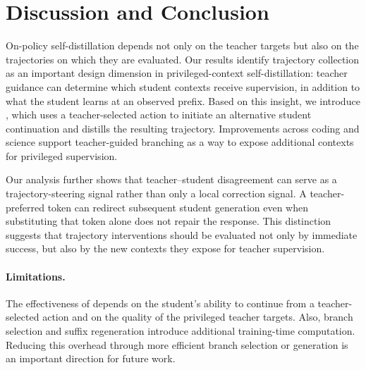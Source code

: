 \section{Discussion and Conclusion}
\label{sec:discussion}









On-policy self-distillation depends not only on the teacher targets but also on the trajectories on which they are evaluated. Our results identify trajectory collection as an important design dimension in privileged-context self-distillation: teacher guidance can determine which student contexts receive supervision, in addition to what the student learns at an observed prefix. Based on this insight, we introduce \method{}, which uses a teacher-selected action to initiate an alternative student continuation and distills the resulting trajectory. Improvements across coding and science support teacher-guided branching as a way to expose additional contexts for privileged supervision.

Our analysis further shows that teacher--student disagreement can serve as a trajectory-steering signal rather than only a local correction signal. A teacher-preferred token can redirect subsequent student generation even when substituting that token alone does not repair the response. This distinction suggests that trajectory interventions should be evaluated not only by immediate success, but also by the new contexts they expose for teacher supervision.

\vspace{-0.1cm}\paragraph{Limitations.}
The effectiveness of \method{} depends on the student's ability to continue from a teacher-selected action and on the quality of the privileged teacher targets. Also, branch selection and suffix regeneration introduce additional training-time computation. Reducing this overhead through more efficient branch selection or generation is an important direction for future work.